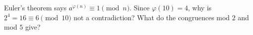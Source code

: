 Euler's theorem says $a^{\varphi(n)}\equiv1\pmod n$. Since $\varphi(10)=4$, why is $2^4=16\equiv6\pmod{10}$ not a contradiction? What do the congruences mod $2$ and mod $5$ give?

